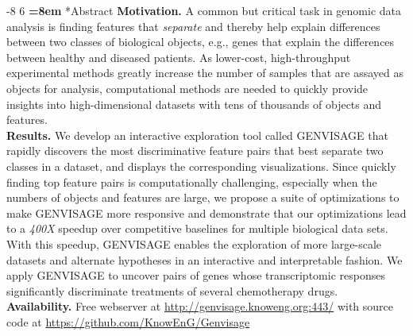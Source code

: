 \documentclass[10pt,letterpaper]{article}
\makeatletter
\renewcommand\section{\@startsection{section}{1}{\z@}%
                       {-8\p@ \@plus -4\p@ \@minus -4\p@}%
                       {6\p@ \@plus 4\p@ \@minus 4\p@}%
                       {\normalfont\large\bfseries\boldmath
                        \rightskip=\z@ \@plus 8em\pretolerance=10000 }}
\newcommand{\genviz}{{\sc G{\small ENVISAGE}}\xspace}
\newcommand{\new}[1]{#1}
\makeatother
\begin{document}
\section*{Abstract}
\textbf{Motivation.} \new{A common but critical task in genomic data analysis is 
finding features that {\em separate} and thereby help explain  
differences between two classes of biological objects, e.g., genes that 
explain the differences between healthy and 
diseased patients.  As lower-cost, high-throughput experimental methods greatly 
increase the number of samples that are assayed as objects for analysis, 
computational methods are needed to quickly provide insights into 
high-dimensional datasets with tens of thousands of objects and features.}\\
\noindent
\textbf{Results.} We develop an \new{interactive exploration} tool called 
\genviz that \new{rapidly discovers the most discriminative 
feature pairs that best separate two classes in a dataset,} 
and \new{displays} the corresponding 
visualizations. 
Since quickly finding top feature pairs is computationally 
challenging, especially when the numbers of objects and features are large, we 
propose a suite of optimizations to make \genviz more responsive and demonstrate 
that our optimizations lead to a \new{{\em 400X}} speedup over competitive 
baselines for multiple biological data sets. With this speedup, \genviz enables 
the exploration of more \new{large-scale} datasets \new{and alternate} 
hypotheses in an interactive \new{and interpretable} fashion. We apply \genviz to uncover pairs of genes 
whose transcriptomic responses significantly discriminate 
treatments of \new{several} chemotherapy drugs.\\

\noindent \textbf{Availability.} Free webserver at 
\url{http://genvisage.knoweng.org:443/} with source code at 
\url{https://github.com/KnowEnG/Genvisage} \\

\linenumbers



\end{document}
